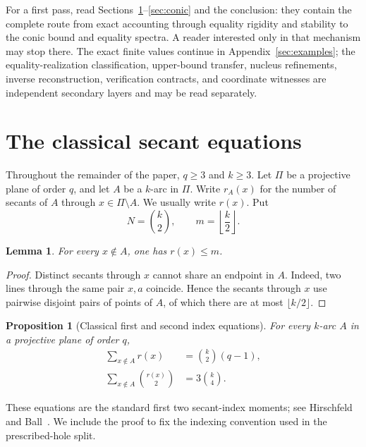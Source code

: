 \documentclass[11pt]{article}
\newtheorem{proposition}[theorem]{Proposition}
\newtheorem{lemma}[theorem]{Lemma}
\theoremstyle{definition}
\theoremstyle{remark}
\begin{document}
For a first pass, read Sections~\ref{sec:classical}--\ref{sec:conic} and the
conclusion: they contain the complete route from exact accounting through
equality rigidity and stability to the conic bound and equality spectra.  A
reader interested only in that mechanism may stop there.  The exact finite
values continue in Appendix~\ref{sec:examples}; the equality-realization
classification, upper-bound transfer, nucleus refinements, inverse
reconstruction, verification contracts, and coordinate witnesses are
independent secondary layers and may be read separately.

\section{The classical secant equations}
\label{sec:classical}

Throughout the remainder of the paper, $q\ge3$ and $k\ge3$.  Let $\Pi$ be
a projective plane of order $q$, and let $A$ be a $k$-arc in $\Pi$.  Write
$r_A(x)$ for the number of secants of $A$ through
$x\in\Pi\setminus A$.  We usually write $r(x)$.  Put
\[
 N=\binom{k}{2},
 \qquad
 m=\left\lfloor\frac{k}{2}\right\rfloor.
\]

\begin{lemma}\label{lem:max-index}
For every $x\notin A$, one has $r(x)\le m$.
\end{lemma}

\begin{proof}
Distinct secants through $x$ cannot share an endpoint in $A$.  Indeed, two
lines through the same pair $x,a$ coincide.  Hence the secants through $x$
use pairwise disjoint pairs of points of $A$, of which there are at most
$\lfloor k/2\rfloor$.
\end{proof}

\begin{proposition}[Classical first and second index equations]
\label{prop:moments}
For every $k$-arc $A$ in a projective plane of order $q$,
\begin{align}
 \sum_{x\notin A}r(x)
   &=\binom{k}{2}(q-1), \label{eq:first-moment}\\
 \sum_{x\notin A}\binom{r(x)}2
   &=3\binom{k}{4}. \label{eq:second-moment}
\end{align}
\end{proposition}

These equations are the standard first two secant-index moments; see
Hirschfeld~\cite[Chapter~9]{Hirschfeld1998} and
Ball~\cite[p.~34]{Ball1997}.  We include the proof to fix the indexing
convention used in the prescribed-hole split.
\end{document}
